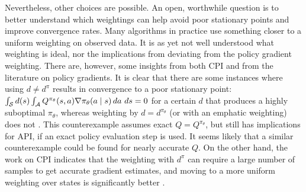 \documentclass[\main/thesis.tex]{subfiles}
\begin{document}
Nevertheless, other choices are possible. An open, worthwhile question is to better understand which weightings can help avoid poor stationary points and improve convergence rates. Many algorithms in practice use something closer to a uniform weighting on observed data. It is as yet not well understood what weighting is ideal, nor the implications from deviating from the policy gradient weighting. There are, however, some insights from both CPI and from the literature on policy gradients. It is clear that there are some instances where using $d \neq d^\pi$ results in convergence to a poor stationary point: $\int_{\mathcal{S}} d(s)\int_{\mathcal{A}} Q^{\pi_\theta}(s,a) \nabla \pi_\theta(a \mid s) \, da \ ds = 0$ for a certain $d$ that produces a highly suboptimal $\pi_\theta$, whereas weighting by $d = d^{\pi_\theta}$ (or with an emphatic weighting) does not \citep{imani2018off}. This counterexample assumes exact $Q = Q^{\pi_\theta}$, but still has implications for API, if an exact policy evaluation step is used. It seems likely that a similar counterexample could be found for nearly accurate $Q$. On the other hand, the work on CPI indicates that the weighting with $d^\pi$ can require a large number of samples to get accurate gradient estimates, and moving to a more uniform weighting over states is significantly better \citep{kakade2002approximately}. 

\end{document}
